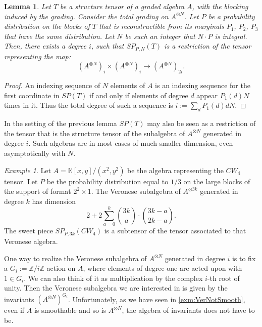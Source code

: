 \documentclass[a4paper,11pt,reqno]{amsart}
\newcommand{\bbK}{\mathbb{K}}
\newcommand{\bbZ}{\mathbb{Z}}
\newcommand{\oldtext}[1]{\textcolor{darkelectricblue}{#1}}
\numberwithin{equation}{section}
\theoremstyle{definition}
\theoremstyle{plain}
\newtheorem{lem}[defn]{Lemma}
\theoremstyle{remark}
\newtheorem{exam}[defn]{Example}
\begin{document}
\begin{lem}
Let $T$ be a structure tensor of a graded algebra $A$, with the blocking induced by the grading. Consider the total grading on $A^{\otimes N}$. Let $P$ be a probability distribution on the blocks of $T$ that is reconstructible from its marginals $P_1$, $P_2$, $P_3$ that have the same distribution. Let $N$ be such an integer that $N\cdot P$ is integral.
Then, there exists a degree $i$, such that $SP_{P,N}(T)$ is a restriction of the tensor representing the map:
\[(A^{\otimes N})_i\times (A^{\otimes N})_i\rightarrow (A^{\otimes N})_{2i}.\]
\end{lem}
\begin{proof}
An indexing sequence of $N$ elements of $A$ is an indexing sequence for the first coordinate in $SP(T)$ if and only if elements of degree $d$ appear $P_1(d)N$ times in it. Thus the total degree of such a sequence is $i:=\sum_d P_1(d)dN$.
\end{proof}
In the setting of the previous lemma
$SP(T)$ may also be seen as a restriction of the tensor that is the structure tensor of the subalgebra of $A^{\otimes N}$ generated in degree $i$. Such algebras are in most cases of much smaller dimension, even asymptotically with $N$.
\begin{exam}\label{exam:Vero}
Let $A=\bbK [x,y]/(x^2,y^2)$ be the algebra representing the $CW_4$ tensor. Let $P$ be the probability distribution equal to $1/3$ on the large blocks of the support of format $2^2\times 1$. The Veronese subalgebra of $A^{\otimes 3k}$ generated in degree $k$ has dimension \[2+2\sum_{a=0}^k \binom{3k}{a}\cdot\binom{3k-a}{2k-a}.\] The sweet piece $SP_{P,3k}(CW_4)$ is a subtensor of the tensor associated to that Veronese algebra.
\end{exam}
One way to realize the Veronese subalgebra of $A^{\otimes N}$ generated in degree $i$ is to fix a $G_i:=\bbZ/i\bbZ$ action on $A$, where elements of degree one are acted upon with $1\in G_i$. We can also think of it as multiplication by the complex $i$-th root of unity. Then the Veronese subalgebra we are interested in is given by the invariants $(A^{\otimes N})^{G_i}$. Unfortunately, as we have seen in \autoref{exm:VerNotSmooth}, even if $A$ is smoothable and so is $ A^{\otimes N}$, the algebra of invariants does not have to be.
\end{document}
